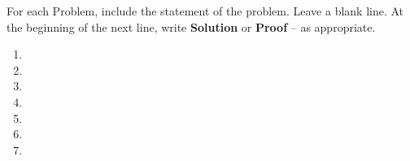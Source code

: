 For each Problem, include the statement of the problem. Leave a blank line.  At the beginning of the next line, write \textbf{Solution} or \textbf{Proof} -- as appropriate.

\begin{enumerate}
    \item 
    \newpage
    \item 
    \vspace{1.2in}
    \item 
    \newpage
    \item 
    
    \newpage
    \item 
    
    \newpage
    \item 
    \newpage
    \item 
    
    \end{enumerate}